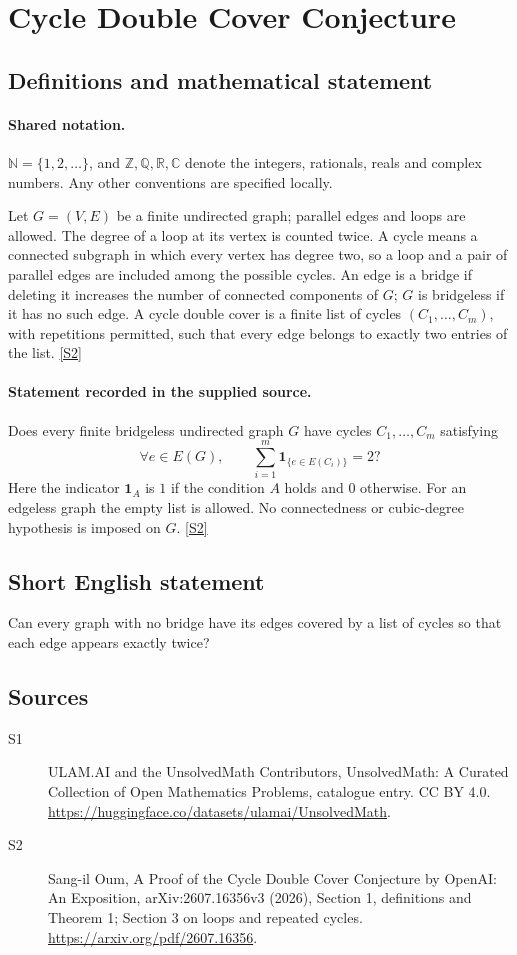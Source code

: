 \documentclass[11pt]{article}
\newcommand{\sref}[2]{\hyperlink{source:#1:#2}{[S#2]}}
\begin{document}
\section{Cycle Double Cover Conjecture}\label{statement}

\subsection{Definitions and mathematical statement}

\paragraph{Shared notation.}$\mathbb N=\{1,2,\ldots\}$, and $\mathbb Z,\mathbb Q,\mathbb R,\mathbb C$ denote the integers, rationals, reals and complex numbers. Any other conventions are specified locally.


Let $G=(V,E)$ be a finite undirected graph; parallel edges and loops are allowed. The degree of a loop at its vertex is counted twice. A cycle means a connected subgraph in which every vertex has degree two, so a loop and a pair of parallel edges are included among the possible cycles. An edge is a bridge if deleting it increases the number of connected components of $G$; $G$ is bridgeless if it has no such edge. A cycle double cover is a finite list of cycles $(C_1,\ldots,C_m)$, with repetitions permitted, such that every edge belongs to exactly two entries of the list. \sref{statement}{2}
\paragraph{Statement recorded in the supplied source.}
Does every finite bridgeless undirected graph $G$ have cycles $C_1,\ldots,C_m$ satisfying
\[
 \forall e\in E(G),\qquad
 \sum_{i=1}^m\mathbf 1_{\{e\in E(C_i)\}}=2?
\]
Here the indicator $\mathbf 1_A$ is $1$ if the condition $A$ holds and $0$ otherwise. For an edgeless graph the empty list is allowed. No connectedness or cubic-degree hypothesis is imposed on $G$. \sref{statement}{2}
\subsection{Short English statement}
Can every graph with no bridge have its edges covered by a list of cycles so that each edge appears exactly twice?
\subsection{Sources}
\begin{description}
\item[\hypertarget{source:statement:1}{S1}] ULAM.AI and the UnsolvedMath Contributors, UnsolvedMath: A Curated Collection of Open Mathematics Problems, catalogue entry. CC BY 4.0. \url{https://huggingface.co/datasets/ulamai/UnsolvedMath}.
\item[\hypertarget{source:statement:2}{S2}] Sang-il Oum, A Proof of the Cycle Double Cover Conjecture by OpenAI: An Exposition, arXiv:2607.16356v3 (2026), Section 1, definitions and Theorem 1; Section 3 on loops and repeated cycles. \url{https://arxiv.org/pdf/2607.16356}.
\end{description}
\label{end:statement}
\end{document}
